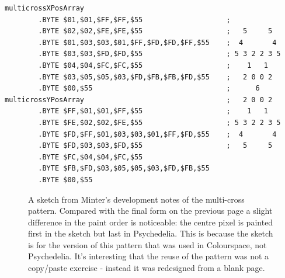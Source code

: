 \begin{lstlisting}
multicrossXPosArray 
        .BYTE $01,$01,$FF,$FF,$55                    ;
        .BYTE $02,$02,$FE,$FE,$55                    ;   5     5  
        .BYTE $01,$03,$03,$01,$FF,$FD,$FD,$FF,$55    ;  4       4 
        .BYTE $03,$03,$FD,$FD,$55                    ; 5 3 2 2 3 5
        .BYTE $04,$04,$FC,$FC,$55                    ;    1   1   
        .BYTE $03,$05,$05,$03,$FD,$FB,$FB,$FD,$55    ;   2 0 0 2  
        .BYTE $00,$55                                ;      6     
multicrossYPosArray                                  ;   2 0 0 2  
        .BYTE $FF,$01,$01,$FF,$55                    ;    1   1   
        .BYTE $FE,$02,$02,$FE,$55                    ; 5 3 2 2 3 5
        .BYTE $FD,$FF,$01,$03,$03,$01,$FF,$FD,$55    ;  4       4 
        .BYTE $FD,$03,$03,$FD,$55                    ;   5     5  
        .BYTE $FC,$04,$04,$FC,$55                    
        .BYTE $FB,$FD,$03,$05,$05,$03,$FD,$FB,$55    
        .BYTE $00,$55
\end{lstlisting}

\clearpage
\begin{figure}[H]
    \centering
    \begin{adjustbox}{width=7cm,center}
    \end{adjustbox}
\caption{
  A sketch from Minter's development notes of the multi-cross pattern. Compared with the final form on the previous page
  a slight difference in the paint order is noticeable: the centre pixel is painted first in the sketch but last in Psychedelia.
  This is because the sketch is for the version of this pattern that was used in Colourspace, not Psychedelia. It's interesting
  that the reuse of the pattern was not a copy/paste exercise - instead it was redesigned from a blank page.
  }
\end{figure}
